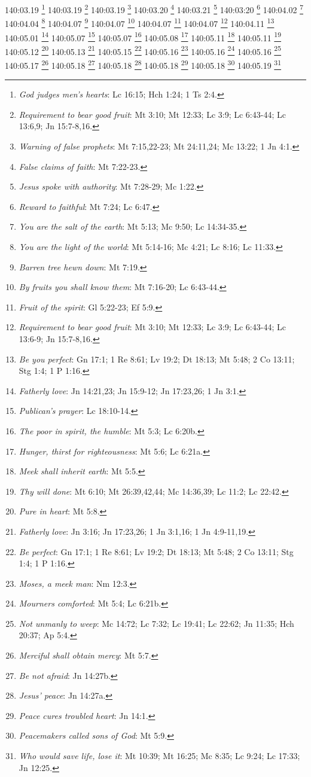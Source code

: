 {{{{{{{{{{{{{{{{{{{{{{{{{{{{{{{{{140:03.19 \footnote{\textit{God judges men's hearts}: Lc 16:15; Hch 1:24; 1 Ts 2:4.}
140:03.19 \footnote{\textit{Requirement to bear good fruit}: Mt 3:10; Mt 12:33; Lc 3:9; Lc 6:43-44; Lc 13:6,9; Jn 15:7-8,16.}
140:03.19 \footnote{\textit{Warning of false prophets}: Mt 7:15,22-23; Mt 24:11,24; Mc 13:22; 1 Jn 4:1.}
140:03.20 \footnote{\textit{False claims of faith}: Mt 7:22-23.}
140:03.21 \footnote{\textit{Jesus spoke with authority}: Mt 7:28-29; Mc 1:22.}
140:03:20 \footnote{\textit{Reward to faithful}: Mt 7:24; Lc 6:47.}
140:04.02 \footnote{\textit{You are the salt of the earth}: Mt 5:13; Mc 9:50; Lc 14:34-35.}
140:04.04 \footnote{\textit{You are the light of the world}: Mt 5:14-16; Mc 4:21; Lc 8:16; Lc 11:33.}
140:04.07 \footnote{\textit{Barren tree hewn down}: Mt 7:19.}
140:04.07 \footnote{\textit{By fruits you shall know them}: Mt 7:16-20; Lc 6:43-44.}
140:04.07 \footnote{\textit{Fruit of the spirit}: Gl 5:22-23; Ef 5:9.}
140:04.07 \footnote{\textit{Requirement to bear good fruit}: Mt 3:10; Mt 12:33; Lc 3:9; Lc 6:43-44; Lc 13:6-9; Jn 15:7-8,16.}
140:04.11 \footnote{\textit{Be you perfect}: Gn 17:1; 1 Re 8:61; Lv 19:2; Dt 18:13; Mt 5:48; 2 Co 13:11; Stg 1:4; 1 P 1:16.}
140:05.01 \footnote{\textit{Fatherly love}: Jn 14:21,23; Jn 15:9-12; Jn 17:23,26; 1 Jn 3:1.}
140:05.07 \footnote{\textit{Publican's prayer}: Lc 18:10-14.}
140:05.07 \footnote{\textit{The poor in spirit, the humble}: Mt 5:3; Lc 6:20b.}
140:05.08 \footnote{\textit{Hunger, thirst for righteousness}: Mt 5:6; Lc 6:21a.}
140:05.11 \footnote{\textit{Meek shall inherit earth}: Mt 5:5.}
140:05.11 \footnote{\textit{Thy will done}: Mt 6:10; Mt 26:39,42,44; Mc 14:36,39; Lc 11:2; Lc 22:42.}
140:05.12 \footnote{\textit{Pure in heart}: Mt 5:8.}
140:05.13 \footnote{\textit{Fatherly love}: Jn 3:16; Jn 17:23,26; 1 Jn 3:1,16; 1 Jn 4:9-11,19.}
140:05.15 \footnote{\textit{Be perfect}: Gn 17:1; 1 Re 8:61; Lv 19:2; Dt 18:13; Mt 5:48; 2 Co 13:11; Stg 1:4; 1 P 1:16.}
140:05.16 \footnote{\textit{Moses, a meek man}: Nm 12:3.}
140:05.16 \footnote{\textit{Mourners comforted}: Mt 5:4; Lc 6:21b.}
140:05.16 \footnote{\textit{Not unmanly to weep}: Mc 14:72; Lc 7:32; Lc 19:41; Lc 22:62; Jn 11:35; Hch 20:37; Ap 5:4.}
140:05.17 \footnote{\textit{Merciful shall obtain mercy}: Mt 5:7.}
140:05.18 \footnote{\textit{Be not afraid}: Jn 14:27b.}
140:05.18 \footnote{\textit{Jesus' peace}: Jn 14:27a.}
140:05.18 \footnote{\textit{Peace cures troubled heart}: Jn 14:1.}
140:05.18 \footnote{\textit{Peacemakers called sons of God}: Mt 5:9.}
140:05.19 \footnote{\textit{Who would save life, lose it}: Mt 10:39; Mt 16:25; Mc 8:35; Lc 9:24; Lc 17:33; Jn 12:25.}
}}}}}}}}}}}}}}}}}}}}}}}}}}}}}}}}}
